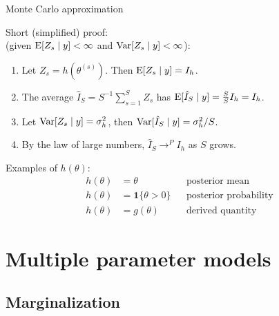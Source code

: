 \documentclass[10pt]{beamer}
\begin{document}
\begin{frame}{Monte Carlo approximation}

  Short (simplified) proof: \\(given $\mathrm{E}[Z_s \mid y] <\infty$ and  $\mathrm{Var}[Z_s \mid y]<\infty$):
  \begin{enumerate}
  \item Let $Z_s=h(\theta^{(s)})$. Then
    $\mathrm{E}[Z_s \mid y]=I_h$.\pause
  \item The average $\hat{I}_S=S^{-1}\sum_{s=1}^{S}Z_s$ has
    $\mathrm{E}[\hat{I}_S \mid y]=\frac{S}{S} I_h = I_h$.\pause
  \item Let $\mathrm{Var}[Z_s \mid y]=\sigma_h^2$, then
    $\mathrm{Var}[\hat{I}_S \mid y]=\sigma_h^2/S$.\pause
  \item By the law of large numbers, $\hat{I}_S \to^P I_h$ as $S$ grows.
  \end{enumerate}
\pause
  Examples of $h(\theta)$:
  \begin{align*}
    h(\theta)&=\theta
      && \text{posterior mean}\\
    h(\theta)&=\mathbf{1}\{\theta>0\}
      && \text{posterior probability}\\
    h(\theta)&=g(\theta)
      && \text{derived quantity}
  \end{align*}



\end{frame}

\section{Multiple parameter models}
\frame{\sectionpage}
\subsection{Marginalization}
\end{document}
